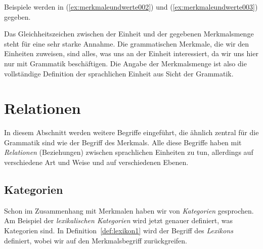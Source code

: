 Beispiele werden in (\ref{ex:merkmaleundwerte002}) und (\ref{ex:merkmaleundwerte003}) gegeben.

\begin{exe}
  \ex\label{ex:merkmaleundwerte003}
  \begin{xlist}
  \end{xlist}
\end{exe}

Das Gleichheitszeichen zwischen der Einheit und der gegebenen Merkmalsmenge steht für eine sehr starke Annahme.
Die grammatischen Merkmale, die wir den Einheiten zuweisen, sind alles, was uns an der Einheit interessiert, da wir uns hier nur mit Grammatik beschäftigen.
Die Angabe der Merkmalsmenge ist also die vollständige Definition der sprachlichen Einheit aus Sicht der Grammatik.


\section{Relationen}
\label{sec:relationen}

In diesem Abschnitt werden weitere Begriffe eingeführt, die ähnlich zentral für die Grammatik sind wie der Begriff des Merkmals.
Alle diese Begriffe haben mit \textit{Relationen} (Beziehungen) zwischen sprachlichen Einheiten zu tun, allerdings auf verschiedene Art und Weise und auf verschiedenen Ebenen.

\subsection{Kategorien}
\label{sec:kategorien}


Schon im Zusammenhang mit Merkmalen haben wir von \textit{Kategorien} gesprochen.
Am Beispiel der \textit{lexikalischen Kategorien} wird jetzt genauer definiert, was Kategorien sind.
In Definition~\ref{def:lexikon1} wird der Begriff des \textit{Lexikons} definiert, wobei wir auf den Merkmalsbegriff zurückgreifen.

